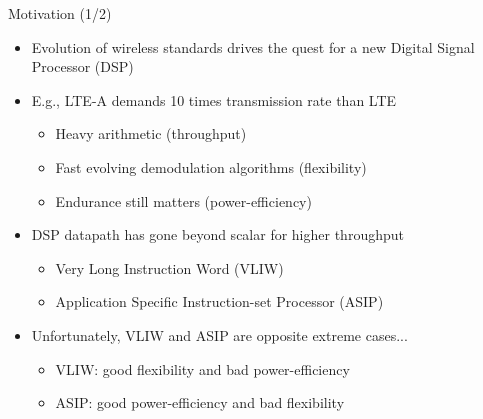 \documentclass{beamer}
\begin{document}
\begin{CJK}{UTF8}{bkai}
    \begin{frame}{Motivation (1/2)}
        \begin{itemize}
            \item <2->{
                    Evolution of wireless standards drives the quest for a new Digital Signal Processor (DSP)
                }
            \item <3->{
                    E.g., LTE-A demands 10 times transmission rate than LTE
                    \begin{itemize}
                        \item {
                                Heavy arithmetic (throughput)
                            }
                        \item {
                                Fast evolving demodulation algorithms (flexibility)
                            }
                        \item {
                                Endurance still matters (power-efficiency)
                            }
                    \end{itemize}
                }
            \item <4->{ 
                    DSP datapath has gone beyond scalar for higher throughput
                    \begin{itemize}
                        \item Very Long Instruction Word (VLIW)
                        \item Application Specific Instruction-set Processor (ASIP)
                    \end{itemize}
                }
            \item <5->{
                    Unfortunately, VLIW and ASIP are opposite extreme cases...
                    \begin{itemize}
                        \item VLIW: good flexibility and bad power-efficiency
                        \item ASIP: good power-efficiency and bad flexibility
                    \end{itemize}
                }
        \end{itemize}
        \vspace{1em}
        \centering
    \end{frame}


\end{CJK}
\end{document}
